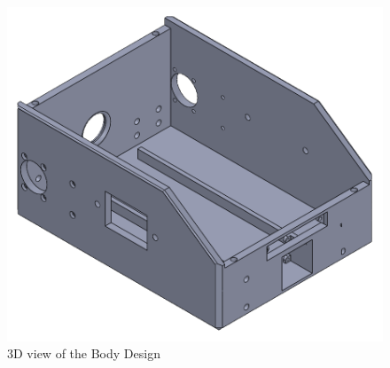 \vspace{10cm}
\begin{figure}[h]
	\centering
	\includegraphics[width=0.8\linewidth]{Body_Design_3}
	\caption[3D view of the Body Design]{3D view of the Body Design}
	\label{fig:bodydesign3}
\end{figure}

\newpage
